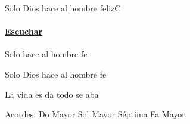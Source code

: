 \documentclass[12pt, spanish]{book}
\newcommand{\NotCCLIed}{\relax}
\begin{document}
    \begin{song}{Solo Dios hace al hombre feliz}{C}
        {} %
        {}
        {} %
        {} %
        \ifChordBk
        \paragraph{\mbox{}\hfill\protect\href{https://open.spotify.com/intl-es/track/0t95oHRKMBi5wxaD8RSXC7}{Escuchar}\mbox{}\hfill}
        \fi

        \begin{SBOpGroup}
            Solo  hace al hombre fe

            Solo Dios hace al hombre fe

            La vida es da todo se aba
        \end{SBOpGroup}


        \ifChordBk
        \begin{SBOpGroup}
            Acordes:
            \upchord{\C}\qquad Do Mayor \hfill
            \upchord{\Gseven}\qquad Sol Mayor S\'eptima \hfill\null\break
            \upchord{\F}\qquad Fa Mayor \hfill
        \end{SBOpGroup}
        \fi
    \end{song}
\end{document}
